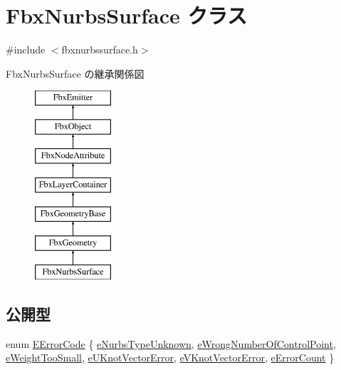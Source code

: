 \hypertarget{class_fbx_nurbs_surface}{}\section{Fbx\+Nurbs\+Surface クラス}
\label{class_fbx_nurbs_surface}


{\ttfamily \#include $<$fbxnurbssurface.\+h$>$}

Fbx\+Nurbs\+Surface の継承関係図\begin{figure}[H]
\begin{center}
\leavevmode
\includegraphics[height=7.000000cm]{class_fbx_nurbs_surface}
\end{center}
\end{figure}
\subsection*{公開型}
\begin{DoxyCompactItemize}
\item 
enum \hyperlink{class_fbx_nurbs_surface_adadf65d5c2d4ecb11d0d084c7312106a}{E\+Error\+Code} \{ \newline
\hyperlink{class_fbx_nurbs_surface_adadf65d5c2d4ecb11d0d084c7312106aa4af927e784b47e879aeb1672a67594c5}{e\+Nurbs\+Type\+Unknown}, 
\hyperlink{class_fbx_nurbs_surface_adadf65d5c2d4ecb11d0d084c7312106aa79c07305f494a6d2e922d8dc56bc71af}{e\+Wrong\+Number\+Of\+Control\+Point}, 
\hyperlink{class_fbx_nurbs_surface_adadf65d5c2d4ecb11d0d084c7312106aa92e4b302bc53a2dcef4d27e9e4f3a272}{e\+Weight\+Too\+Small}, 
\hyperlink{class_fbx_nurbs_surface_adadf65d5c2d4ecb11d0d084c7312106aa5d18ce8baa2740bcaa391a98a7ffbd92}{e\+U\+Knot\+Vector\+Error}, 
\newline
\hyperlink{class_fbx_nurbs_surface_adadf65d5c2d4ecb11d0d084c7312106aa2dddd5da07320e0e7260829ce503abe6}{e\+V\+Knot\+Vector\+Error}, 
\hyperlink{class_fbx_nurbs_surface_adadf65d5c2d4ecb11d0d084c7312106aaeca9620353bd711c0f6c26c263304df5}{e\+Error\+Count}
 \}
\end{DoxyCompactItemize}
